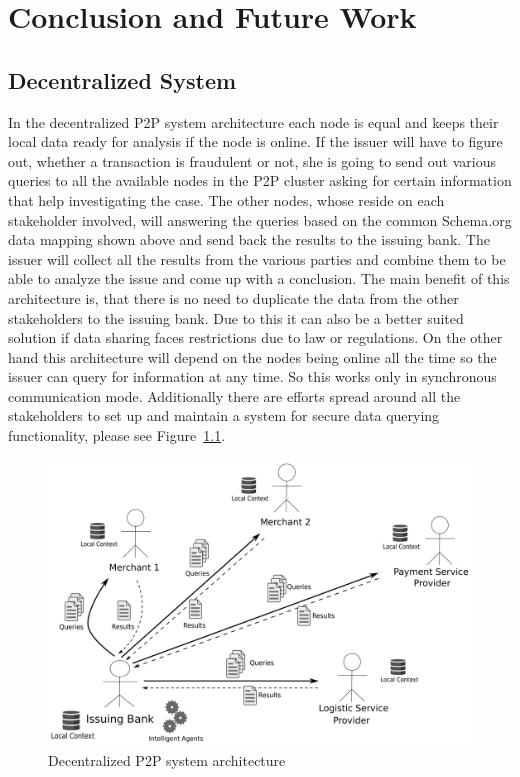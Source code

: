 
\chapter{Conclusion and Future Work} %
\label{cha:conclusion}


\section{Decentralized System}
\label{sec:p2p_decentralized_system}

In the decentralized P2P system architecture each node is equal and keeps their local data ready for analysis if the node is online. If the issuer will have to figure out, whether a transaction is fraudulent or not, she is going to send out various queries to all the available nodes in the P2P cluster asking for certain information that help investigating the case. The other nodes, whose reside on each stakeholder involved, will answering the queries based on the common Schema.org data mapping shown above and send back the results to the issuing bank. The issuer will collect all the results from the various parties and combine them to be able to analyze the issue and come up with a conclusion. The main benefit of this architecture is, that there is no need to duplicate the data from the other stakeholders to the issuing bank. Due to this it can also be a better suited solution if data sharing faces restrictions due to law or regulations. On the other hand this architecture will depend on the nodes being online all the time so the issuer can query for information at any time. So this works only in synchronous communication mode. Additionally there are efforts spread around all the stakeholders to set up and maintain a system for secure data querying functionality, please see Figure~\ref{fig:images_p2p_decentralized}.

\begin{figure}[H]
	\centering
		\includegraphics[width=0.8\columnwidth]{images/system_P2P_decentralized.pdf}
	\caption{Decentralized \gls{P2P} system architecture}
\label{fig:images_p2p_decentralized}
\end{figure}


